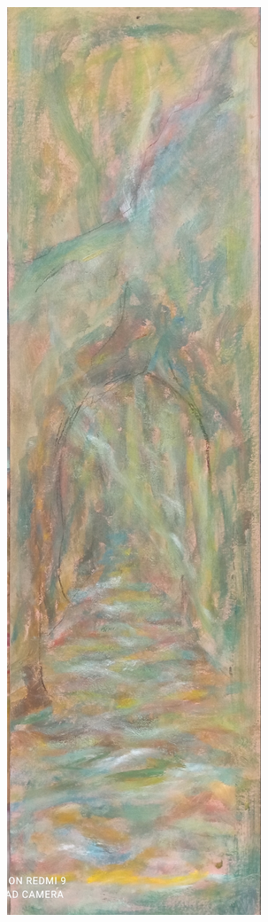 \documentclass[twoside]{article}
\begin{document}
  \newpage
  \begin{center}
    \includegraphics[width=\textwidth,height=\textheight,keepaspectratio]{assets/Tabla1.jpg}

\end{center}
\end{document}

